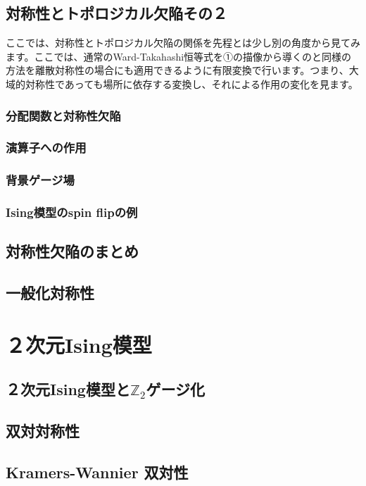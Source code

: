 \documentclass[report,paper=a4, fontsize=12pt, line_length=16cm, number_of_lines=33,dvipdfmx]{jlreq}
\numberwithin{equation}{chapter}
\newcommand{\Ztwo}{\mbox{$\mathbb{Z}_{2}$}}
\begin{document}
\section{対称性とトポロジカル欠陥その２}
ここでは、対称性とトポロジカル欠陥の関係を先程とは少し別の角度から見てみます。ここでは、通常のWard-Takahashi恒等式を①の描像から導くのと同様の方法を離散対称性の場合にも適用できるように有限変換で行います。つまり、大域的対称性であっても場所に依存する変換し、それによる作用の変化を見ます。

\subsection{分配関数と対称性欠陥}

\subsection{演算子への作用}

\subsection{背景ゲージ場}

\subsection{Ising模型のspin flipの例}

\section{対称性欠陥のまとめ}


\section{一般化対称性}



\chapter{２次元Ising模型}

\section{２次元Ising模型と\texorpdfstring{\Ztwo}{Z2}ゲージ化}
\section{双対対称性}
\section{Kramers-Wannier 双対性}
\end{document}
